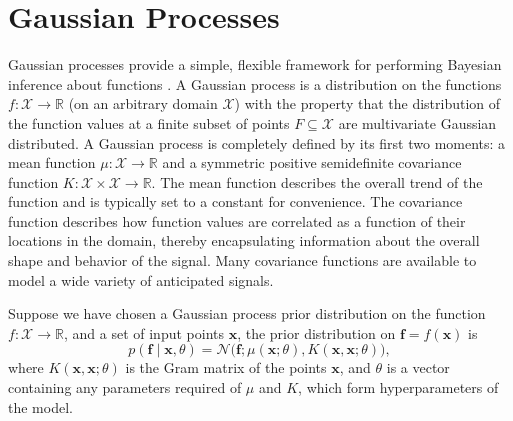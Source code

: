 \documentclass[twoside]{article}
\newcommand{\R}{\ensuremath{\mathbb{R}}}
\newcommand{\deq}{=}
\newcommand{\given}{\!\ensuremath{\mid}\!}
\newcommand{\cm}[1]{\ensuremath{\mathcal{#1}}}
\newcommand{\bm}[1]{\ensuremath{\mathbf{#1}}}
\begin{document}
% 
% 

\section{Gaussian Processes}

Gaussian processes provide a simple, flexible framework for performing
Bayesian inference about functions \citep{gpml}.  A Gaussian process
is a distribution on the functions $f\colon \cm{X} \to \R$ (on an
arbitrary domain $\cm{X}$) with the property that the distribution of
the function values at a finite subset of points $F \subseteq \cm{X}$
are multivariate Gaussian distributed. A Gaussian process is completely defined by its first two moments: a
mean function $\mu\colon \cm{X} \to \R$ and a symmetric positive
semidefinite covariance function $K\colon \cm{X} \times \cm{X} \to
\R$.  The mean function describes the overall trend of the function
and is typically set to a constant for convenience.  The covariance
function describes how function values are correlated as a function of
their locations in the domain, thereby encapsulating information about
the overall shape and behavior of the signal.  Many covariance
functions are available to model a wide variety of anticipated
signals.

Suppose we have chosen a Gaussian process prior distribution on the
function $f\colon \cm{X} \to \R$, and a set of input points $\bm{x}$,
the prior distribution on $\bm{f} \deq f(\bm{x})$ is
\begin{equation*}
 p(\bm{f} \given \bm{x}, \theta)
 =
 \cm{N}
 \bigl(
   \bm{f};
   \mu(\bm{x}; \theta),
   K(\bm{x}, \bm{x}; \theta)
 \bigr),
\end{equation*}
where $K(\bm{x}, \bm{x}; \theta)$ is the Gram matrix of the points
$\bm{x}$, and $\theta$ is a vector containing any parameters required
of $\mu$ and $K$, which form hyperparameters of the model.
\end{document}
